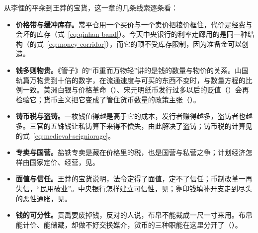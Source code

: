 从李悝的平籴到王莽的宝货，这一章的几条线索逐条看：
\begin{itemize}
\item \textbf{价格带与缓冲库存。}常平仓用一个买价与一个卖价把粮价框住，代价是经费与会坏的库存（式~\eqref{eq:qinhan-band}）。今天中央银行的利率走廊用的是同一种结构（的式~\eqref{eq:money-corridor}），而它的顶不受库存限制，因为准备金可以创造。
\item \textbf{钱多则物贵。}《管子》的“币重而万物轻”讲的是钱的数量与物价的关系。山国轨篇万物贵到十倍的数字，在流通速度与可买的东西不变时，与数量方程的比例一致。美洲白银与价格革命（）、宋元明纸币发行过多以后的贬值（）会再检验它；货币主义把它变成了管住货币数量的政策主张（）。
\item \textbf{铸币税与盗铸。}一枚钱值得越是高于它的成本，发行者赚得越多，盗铸者也越多。三官的五铢钱让私铸算下来得不偿失，由此解决了盗铸；铸币税的计算见的式~\eqref{eq:medieval-seigniorage}。
\item \textbf{专卖与国营。}盐铁专卖是藏在价格里的税，也是国营与私营之争；计划经济怎样由国家定价、经营，见。
\item \textbf{面值与信任。}王莽的宝货说明，法令定得了面值，定不了信任；币制改革一再失信，“民用破业”。中央银行怎样建立可信性，见；靠印钱填补开支走到尽头的恶性通胀，见。
\item \textbf{钱的可分性。}贡禹要废掉钱，反对的人说，布帛不能裁成一尺一寸来用。布帛能计价、能储藏，却做不好交换媒介，货币的三种职能在这里分开了（）。
\end{itemize}

